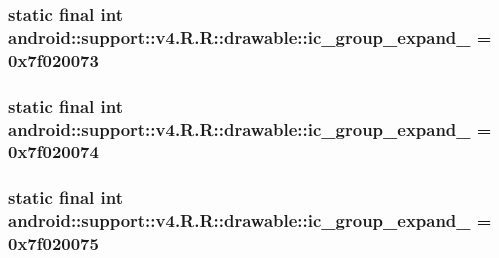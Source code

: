 \hypertarget{classandroid_1_1support_1_1v4_1_1_r_1_1drawable_29ff015359d196ee71353bf477c07966}{
\subsubsection[{ic\_\-group\_\-expand\_\-04}]{\setlength{\rightskip}{0pt plus 5cm}static final int android::support::v4.R.R::drawable::ic\_\-group\_\-expand\_ = 0x7f020073}}
\label{classandroid_1_1support_1_1v4_1_1_r_1_1drawable_29ff015359d196ee71353bf477c07966}


\hypertarget{classandroid_1_1support_1_1v4_1_1_r_1_1drawable_a9d3a09a0bf928ce534064973a975839}{
\subsubsection[{ic\_\-group\_\-expand\_\-05}]{\setlength{\rightskip}{0pt plus 5cm}static final int android::support::v4.R.R::drawable::ic\_\-group\_\-expand\_ = 0x7f020074}}
\label{classandroid_1_1support_1_1v4_1_1_r_1_1drawable_a9d3a09a0bf928ce534064973a975839}


\hypertarget{classandroid_1_1support_1_1v4_1_1_r_1_1drawable_4a53f9cb78a1b502eb6630e7deda93a6}{
\subsubsection[{ic\_\-group\_\-expand\_\-06}]{\setlength{\rightskip}{0pt plus 5cm}static final int android::support::v4.R.R::drawable::ic\_\-group\_\-expand\_ = 0x7f020075}}
\label{classandroid_1_1support_1_1v4_1_1_r_1_1drawable_4a53f9cb78a1b502eb6630e7deda93a6}


